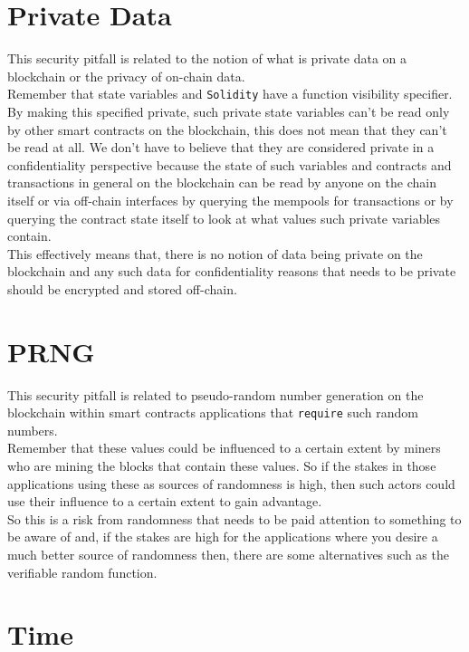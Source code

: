 \section{Private Data}

This security pitfall is related to the notion of what is private data on a blockchain or the privacy of on-chain data. \\

Remember that state variables and \texttt{Solidity} have a function visibility specifier. By making this specified private, such private state variables can't be read only by other smart contracts on the blockchain, this does not mean that they can't be read at all. We don't have to believe that they are considered private in a confidentiality perspective because the state of such variables and contracts and transactions in general on the blockchain can be read by anyone on the chain itself or via off-chain interfaces by querying the mempools for transactions or by querying the contract state itself to look at what values such private variables contain.\\

This effectively means that, there is no notion of data being private on the blockchain and any such data for confidentiality reasons that needs to be private should be encrypted and stored off-chain.

\section{PRNG}

This security pitfall is related to pseudo-random number generation on the blockchain within smart contracts applications that \texttt{require} such random numbers. \\

Remember that these values could be influenced to a certain extent by miners who are mining the blocks that contain these values. So if the stakes in those applications using these as sources of randomness is high, then such actors could use their influence to a certain extent to gain advantage.\\

So this is a risk from randomness that needs to be paid attention to something to be aware of and, if the stakes are high for the applications where you desire a much better source of randomness then, there are some alternatives such as the verifiable random function.

\section{Time}

